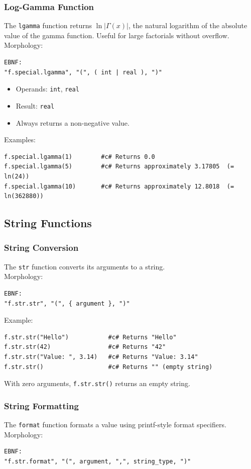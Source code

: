 \subsubsection{Log-Gamma Function}
The \texttt{lgamma} function returns $\ln|\Gamma(x)|$, the natural logarithm of the absolute value of the gamma function. Useful for large factorials without overflow.\\
Morphology:
\begin{verbatim}
EBNF:
"f.special.lgamma", "(", ( int | real ), ")"
\end{verbatim}
\begin{itemize}
\item Operands: \texttt{int}, \texttt{real}
\item Result: \texttt{real}
\item Always returns a non-negative value.
\end{itemize}
Examples:
\begin{verbatim}
f.special.lgamma(1)        #c# Returns 0.0
f.special.lgamma(5)        #c# Returns approximately 3.17805  (= ln(24))
f.special.lgamma(10)       #c# Returns approximately 12.8018  (= ln(362880))
\end{verbatim}

\subsection{String Functions}

\subsubsection{String Conversion}
The \texttt{str} function converts its arguments to a string. \\
Morphology:
\begin{verbatim}
EBNF:
"f.str.str", "(", { argument }, ")"
\end{verbatim}
Example:
\begin{verbatim}
f.str.str("Hello")           #c# Returns "Hello"
f.str.str(42)                #c# Returns "42"
f.str.str("Value: ", 3.14)   #c# Returns "Value: 3.14"
f.str.str()                  #c# Returns "" (empty string)
\end{verbatim}

With zero arguments, \texttt{f.str.str()} returns an empty string.

\subsubsection{String Formatting}
The \texttt{format} function formats a value using printf-style format specifiers. \\
Morphology:
\begin{verbatim}
EBNF:
"f.str.format", "(", argument, ",", string_type, ")"
\end{verbatim}

